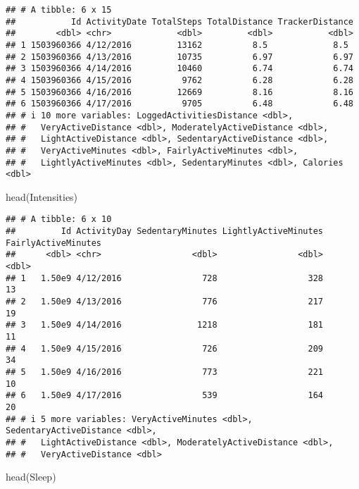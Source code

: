 \documentclass[
]{article}
\newenvironment{Shaded}{\begin{snugshade}}{\end{snugshade}}
\newcommand{\FunctionTok}[1]{\textcolor[rgb]{0.00,0.00,0.00}{#1}}
\newcommand{\NormalTok}[1]{#1}
\begin{document}
\begin{verbatim}
## # A tibble: 6 x 15
##           Id ActivityDate TotalSteps TotalDistance TrackerDistance
##        <dbl> <chr>             <dbl>         <dbl>           <dbl>
## 1 1503960366 4/12/2016         13162          8.5             8.5 
## 2 1503960366 4/13/2016         10735          6.97            6.97
## 3 1503960366 4/14/2016         10460          6.74            6.74
## 4 1503960366 4/15/2016          9762          6.28            6.28
## 5 1503960366 4/16/2016         12669          8.16            8.16
## 6 1503960366 4/17/2016          9705          6.48            6.48
## # i 10 more variables: LoggedActivitiesDistance <dbl>,
## #   VeryActiveDistance <dbl>, ModeratelyActiveDistance <dbl>,
## #   LightActiveDistance <dbl>, SedentaryActiveDistance <dbl>,
## #   VeryActiveMinutes <dbl>, FairlyActiveMinutes <dbl>,
## #   LightlyActiveMinutes <dbl>, SedentaryMinutes <dbl>, Calories <dbl>
\end{verbatim}

\begin{Shaded}
\begin{Highlighting}[]
\FunctionTok{head}\NormalTok{(Intensities)}
\end{Highlighting}
\end{Shaded}

\begin{verbatim}
## # A tibble: 6 x 10
##         Id ActivityDay SedentaryMinutes LightlyActiveMinutes FairlyActiveMinutes
##      <dbl> <chr>                  <dbl>                <dbl>               <dbl>
## 1   1.50e9 4/12/2016                728                  328                  13
## 2   1.50e9 4/13/2016                776                  217                  19
## 3   1.50e9 4/14/2016               1218                  181                  11
## 4   1.50e9 4/15/2016                726                  209                  34
## 5   1.50e9 4/16/2016                773                  221                  10
## 6   1.50e9 4/17/2016                539                  164                  20
## # i 5 more variables: VeryActiveMinutes <dbl>, SedentaryActiveDistance <dbl>,
## #   LightActiveDistance <dbl>, ModeratelyActiveDistance <dbl>,
## #   VeryActiveDistance <dbl>
\end{verbatim}

\begin{Shaded}
\begin{Highlighting}[]
\FunctionTok{head}\NormalTok{(Sleep)}
\end{Highlighting}
\end{Shaded}
\end{document}
